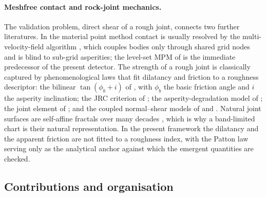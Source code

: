 \documentclass{svjour3}                 %
\begin{document}
\paragraph{Meshfree contact and rock-joint mechanics.}
The validation problem, direct shear of a rough joint, connects two further literatures. In the material point
method \citep{sulsky1994particle} contact is usually resolved by the multi-velocity-field algorithm
\citep{bardenhagen2000granular,bardenhagen2001contact}, which couples bodies only through shared grid nodes and
is blind to sub-grid asperities; the level-set MPM of \citet{liu2020implicit} is the immediate predecessor of
the present detector. The strength of a rough joint is classically captured by phenomenological laws that fit
dilatancy and friction to a roughness descriptor: the bilinear $\tan(\phi_b+i)$ of \citet{patton1966multiple},
with $\phi_b$ the basic friction angle and $i$ the asperity inclination; the JRC criterion of
\citet{barton1977shear,barton1990review}; the asperity-degradation model of \citet{plesha1987constitutive}; the
joint element of \citet{goodman1976methods}; and the coupled normal--shear models of \citet{saeb1992modelling}
and \citet{grasselli2003constitutive}. Natural joint surfaces are self-affine fractals over many decades
\citep{brown1985broad,power1991euclidean,candela2012roughness}, which is why a band-limited chart is their
natural representation. In the present framework the dilatancy and the apparent friction are not fitted to a
roughness index, with the Patton law serving only as the analytical anchor against which the emergent
quantities are checked.

\subsection{Contributions and organisation}\label{sec:intro-contributions}
\end{document}
